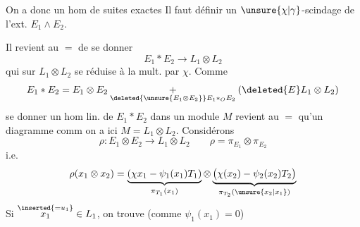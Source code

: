On a donc un hom de suites exactes
Il faut définir un $\unsure{\chi|\gamma}$-scindage de l'ext. $E_1\wedge E_2$.

Il revient au $=$  de se donner
\[
E_1\mathbin{*}E_2\longrightarrow L_1\otimes L_2
\]
qui sur $L_1\otimes L_2$ se réduise à la mult. par $\chi$.
Comme
\[
E_1*E_2=E_1\otimes E_2\mathbin{\underset{\deleted{\unsure{E_1\otimes E_2}}E_1*_{O}E_2}{+}}
(\deleted{E}L_1\otimes L_2)
\]
se donner un hom lin. de $E_1*E_2$ dans un module $M$ revient au $=$ qu'un diagramme comm
 on a ici $M=L_1\otimes L_2$. Considérons
\[
\rho:E_1\otimes E_2\longrightarrow L_1\otimes L_2\qquad \rho=\pi_{E_1}\otimes\pi_{E_2}
\]
i.e.
\[
\rho(x_1\otimes x_2)=
\underbrace{(\chi x_1-\psi_1(x_1)T_1)}_{\pi_{T_1}(x_1)}\otimes
\underbrace{\bigl(\chi(x_2)-\psi_2(x_2)T_2\bigr)}_{\pi_{T_2}(\unsure{x_2|x_1})}
\]
Si $\overset{\inserted{=u_1}}{x_1}\in L_1$, on trouve  (comme $\psi_1(x_1)=0$)
